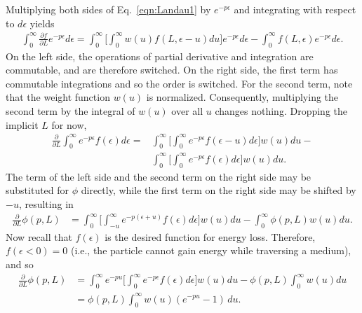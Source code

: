 Multiplying both sides of Eq.~\eqref{eqn:Landau1} by $e^{-p\epsilon}$ and integrating with respect to $d\epsilon$ yields
\begin{align*}
\int_0 ^\infty \frac{\partial f}{\partial L} e^{-p\epsilon} d\epsilon = \int_0 ^\infty \Bigg [\int_0 ^\infty w(u) f(L,\epsilon-u) du \Bigg]e^{-p\epsilon} d\epsilon -  \int_0 ^\infty f(L,\epsilon) e^{-p\epsilon} d\epsilon.
\end{align*}
On the left side, the operations of partial derivative and integration are commutable, and are therefore switched. On the right side, the first term has commutable integrations and so the order is switched. For the second term, note that the weight function $w(u)$ is normalized. Consequently, multiplying the second term by the integral of $w(u)$ over all $u$ changes nothing. Dropping the implicit $L$ for now,
\begin{align*}
\frac{\partial}{\partial L}\int_0 ^\infty e^{-p\epsilon} f(\epsilon) d\epsilon = &\int_0 ^\infty \Bigg[\int_0 ^\infty e^{-p\epsilon} f(\epsilon-u)  d\epsilon \Bigg] w(u) du -\\
 & \int_0 ^\infty \Bigg[\int_0 ^\infty e^{-p\epsilon}f(\epsilon) d\epsilon \Bigg] w(u) du.
\end{align*}
The term of the left side and the second term on the right side may be substituted for $\phi$ directly, while the first term on the right side may be shifted by $-u$, resulting in
\begin{align*}
\frac{\partial}{\partial L} \phi(p,L) &= \int_0 ^\infty \Bigg[\int_{-u} ^\infty e^{-p(\epsilon+u)} f(\epsilon)  d\epsilon \Bigg] w(u) du -\int_0 ^\infty \phi(p,L) w(u) du.
\end{align*}
Now recall that $f(\epsilon)$ is the desired function for energy loss. Therefore, $f(\epsilon<0)=0$ (i.e., the particle cannot gain energy while traversing a medium), and so
\begin{align}
\frac{\partial}{\partial L} \phi(p,L) &= \int_0 ^\infty e^{-pu}\Bigg[\int_{0} ^\infty e^{-p\epsilon} f(\epsilon)  d\epsilon \Bigg] w(u) du -\phi(p,L) \int_0 ^\infty w(u) du\nonumber\\
&=\phi(p,L)\int_0 ^\infty w(u)(e^{-pu}-1)\, du. \nonumber%
\end{align}

